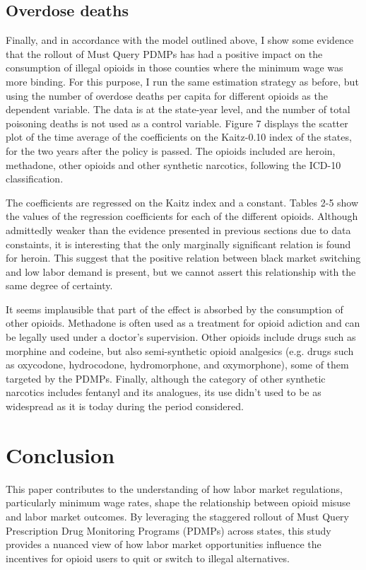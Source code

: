\documentclass[12pt,a4paper]{article}
\begin{document}
\subsection*{Overdose deaths}

Finally, and in accordance with the model outlined above, I show some evidence that the rollout of Must Query PDMPs has had a positive impact on the consumption of illegal opioids in those counties where the minimum wage was more binding.
For this purpose, I run the same estimation strategy as before, but using the number of overdose deaths per capita for different opioids as the dependent variable. 
The data is at the state-year level, and the number of total poisoning deaths is not used as a control variable.
Figure 7 displays the scatter plot of the time average of the coefficients on the Kaitz-0.10 index of the states, for the two years after the policy is passed.
The opioids included are heroin, methadone, other opioids and other synthetic narcotics, following the ICD-10 classification.

The coefficients are regressed on the Kaitz index and a constant. 
Tables 2-5 show the values of the regression coefficients for each of the different opioids.
Although admittedly weaker than the evidence presented in previous sections due to data constaints, it is interesting that the only marginally significant relation is found for heroin.
This suggest that the positive relation between black market switching and low labor demand is present, but we cannot assert this relationship with the same degree of certainty. 

It seems implausible that part of the effect is absorbed by the consumption of other opioids.
Methadone is often used as a treatment for opioid adiction and can be legally used under a doctor's supervision.
Other opioids include drugs such as morphine and codeine, but also semi-synthetic opioid analgesics (e.g. drugs such as oxycodone, hydrocodone, hydromorphone, and oxymorphone), some of them targeted by the PDMPs.
Finally, although the category of other synthetic narcotics includes fentanyl and its analogues, its use didn't used to be as widespread as it is today during the period considered.

\section*{Conclusion}

This paper contributes to the understanding of how labor market regulations, particularly minimum wage rates, shape the relationship between opioid misuse and labor market outcomes. By leveraging the staggered rollout of Must Query Prescription Drug Monitoring Programs (PDMPs) across states, this study provides a nuanced view of how labor market opportunities influence the incentives for opioid users to quit or switch to illegal alternatives.
\end{document}
